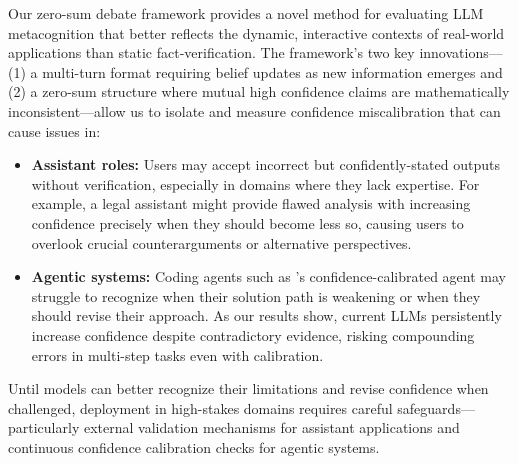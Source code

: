 \documentclass{article}
\begin{document}
Our zero-sum debate framework provides a novel method for evaluating LLM metacognition that better reflects the dynamic, interactive contexts of real-world applications than static fact-verification. The framework's two key innovations— (1) a multi-turn format requiring belief updates as new information emerges and (2) a zero-sum structure where mutual high confidence claims are mathematically inconsistent—allow us to isolate and measure confidence miscalibration that can cause issues in:
\begin{itemize}
    \item \textbf{Assistant roles:} Users may accept incorrect but confidently-stated outputs without verification, especially in domains where they lack expertise. For example, a legal assistant might provide flawed analysis with increasing confidence precisely when they should become less so, causing users to overlook crucial counterarguments or alternative perspectives.
    \item \textbf{Agentic systems:} Coding agents such as \citet{cognitionlabs_devin21_2025}'s confidence-calibrated agent may struggle to recognize when their solution path is weakening or when they should revise their approach. As our results show, current LLMs persistently increase confidence despite contradictory evidence, risking compounding errors in multi-step tasks even with calibration.
\end{itemize}

Until models can better recognize their limitations and revise confidence when challenged, deployment in high-stakes domains requires careful safeguards—particularly external validation mechanisms for assistant applications and continuous confidence calibration checks for agentic systems.


\end{document}
